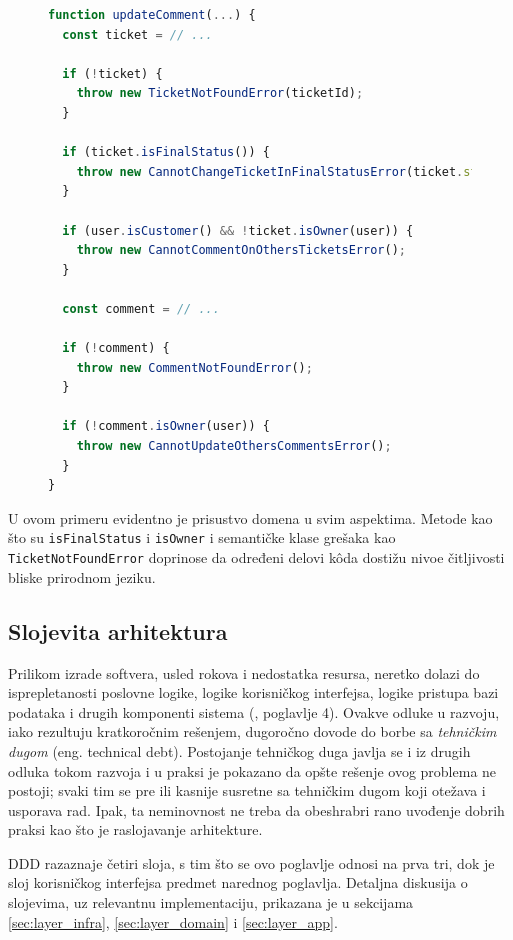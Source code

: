\documentclass[12pt,oneside]{memoir}
\begin{document}
\begin{figure}[h]
\begin{lstlisting}[language=JavaScript, style=ES6, caption={K\^{o}d koji je na domenskom jeziku}]
function updateComment(...) {
  const ticket = // ...

  if (!ticket) {
    throw new TicketNotFoundError(ticketId);
  }

  if (ticket.isFinalStatus()) {
    throw new CannotChangeTicketInFinalStatusError(ticket.status);
  }

  if (user.isCustomer() && !ticket.isOwner(user)) {
    throw new CannotCommentOnOthersTicketsError();
  }

  const comment = // ...

  if (!comment) {
    throw new CommentNotFoundError();
  }

  if (!comment.isOwner(user)) {
    throw new CannotUpdateOthersCommentsError();
  }
}
\end{lstlisting}
\end{figure}

\newpage
U ovom primeru evidentno je prisustvo domena u svim aspektima. Metode kao što su \verb|isFinalStatus| i \verb|isOwner| i semantičke klase grešaka kao \verb|TicketNotFoundError| doprinose da određeni delovi k\^{o}da dostižu nivoe čitljivosti bliske prirodnom jeziku.

\subsection{Slojevita arhitektura}
Prilikom izrade softvera, usled rokova i nedostatka resursa, neretko dolazi do isprepletanosti poslovne logike, logike korisničkog interfejsa, logike pristupa bazi podataka i drugih komponenti sistema (\cite{dddfull}, poglavlje 4). Ovakve odluke u razvoju, iako rezultuju kratkoročnim rešenjem, dugoročno dovode do borbe sa \textit{tehničkim dugom} (eng. technical debt). Postojanje tehničkog duga javlja se i iz drugih odluka tokom razvoja i u praksi je pokazano da opšte rešenje ovog problema ne postoji; svaki tim se pre ili kasnije susretne sa tehničkim dugom koji otežava i usporava rad. Ipak, ta neminovnost ne treba da obeshrabri rano uvođenje dobrih praksi kao što je raslojavanje arhitekture. 

DDD razaznaje četiri sloja, s tim što se ovo poglavlje odnosi na prva tri, dok je sloj korisničkog interfejsa predmet narednog poglavlja. Detaljna diskusija o slojevima, uz relevantnu implementaciju, prikazana je u sekcijama \ref{sec:layer_infra}, \ref{sec:layer_domain} i \ref{sec:layer_app}.
\end{document}
